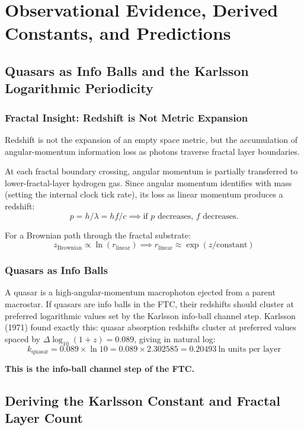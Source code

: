 \documentclass[11pt,a4paper]{article}
\begin{document}
\section{Observational Evidence, Derived Constants, and Predictions}

\subsection{Quasars as Info Balls and the Karlsson Logarithmic Periodicity}

\subsubsection{Fractal Insight: Redshift is Not Metric Expansion}

Redshift is not the expansion of an empty space metric, but the accumulation of
angular-momentum information loss as photons traverse fractal layer boundaries.

At each fractal boundary crossing, angular momentum is partially transferred to
lower-fractal-layer hydrogen gas. Since angular momentum identifies with mass
(setting the internal clock tick rate), its loss as linear momentum produces a
redshift:
\[
  p = h/\lambda = hf/c \implies \text{if } p \text{ decreases, } f \text{ decreases.}
\]

For a Brownian path through the fractal substrate:
\[
  z_{\text{Brownian}} \propto \ln(r_{\text{linear}})
  \implies \boxed{r_{\text{linear}} \approx \exp(z/\text{constant})}
\]

\subsubsection{Quasars as Info Balls}

A quasar is a high-angular-momentum macrophoton ejected from a parent macrostar.
If quasars are info balls in the FTC, their redshifts should cluster at preferred
logarithmic values set by the Karlsson info-ball channel step. Karlsson (1971)
found exactly this: quasar absorption redshifts cluster at preferred values spaced
by $\Delta\log_{10}(1+z) = 0.089$, giving in natural log:
\[
  k_{\text{quasar}} = 0.089\times\ln10 = 0.089\times2.302585
    = \mathbf{0.20493}\ \text{ln units per layer}
\]

\textbf{This is the info-ball channel step of the FTC.}

\subsection{Deriving the Karlsson Constant and Fractal Layer Count}
\end{document}
